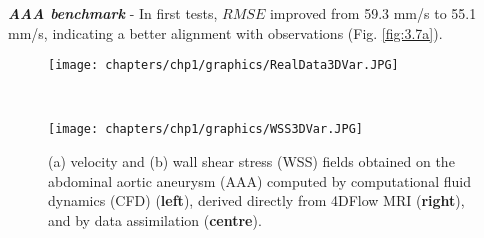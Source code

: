 %

\textbf{\textit{AAA benchmark}} - In first tests, \(RMSE\) improved from 59.3 mm/s to 55.1 mm/s, indicating a better alignment with observations (Fig. \ref{fig:3.7a}). 
\begin{figure}
    \centering
    \begin{minipage}{\textwidth}
        \centering
        \texttt{[image: chapters/chp1/graphics/RealData3DVar.JPG]}
        \label{fig:3.7a}
    \end{minipage}
    \\[1em]  
    \begin{minipage}{\textwidth}
        \centering
        \texttt{[image: chapters/chp1/graphics/WSS3DVar.JPG]}
        \label{fig:3.7b}
    \end{minipage}
    \caption{\small (a) velocity and (b) wall shear stress (WSS) fields obtained on the abdominal aortic aneurysm (AAA) computed by computational fluid dynamics (CFD) (\textbf{left}), derived directly from 4DFlow MRI (\textbf{right}), and by  data assimilation (\textbf{centre}).}
    \label{fig:3.7}
\end{figure}

